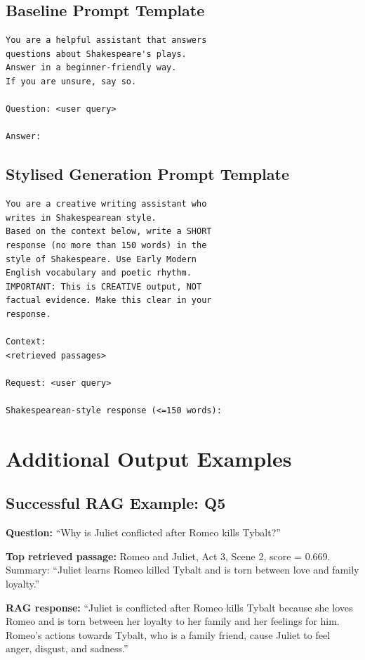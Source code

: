 \documentclass[10pt,conference]{IEEEtran}
\begin{document}
\subsection{Baseline Prompt Template}

\begin{lstlisting}[language={}]
You are a helpful assistant that answers
questions about Shakespeare's plays.
Answer in a beginner-friendly way.
If you are unsure, say so.

Question: <user query>

Answer:
\end{lstlisting}

\subsection{Stylised Generation Prompt Template}

\begin{lstlisting}[language={}]
You are a creative writing assistant who
writes in Shakespearean style.
Based on the context below, write a SHORT
response (no more than 150 words) in the
style of Shakespeare. Use Early Modern
English vocabulary and poetic rhythm.
IMPORTANT: This is CREATIVE output, NOT
factual evidence. Make this clear in your
response.

Context:
<retrieved passages>

Request: <user query>

Shakespearean-style response (<=150 words):
\end{lstlisting}

\section{Additional Output Examples}
\label{app:outputs}

\subsection{Successful RAG Example: Q5}

\textbf{Question:} ``Why is Juliet conflicted after Romeo kills Tybalt?''

\textbf{Top retrieved passage:} Romeo and Juliet, Act 3, Scene 2, score = 0.669. Summary: ``Juliet learns Romeo killed Tybalt and is torn between love and family loyalty.''

\textbf{RAG response:} ``Juliet is conflicted after Romeo kills Tybalt because she loves Romeo and is torn between her loyalty to her family and her feelings for him. Romeo's actions towards Tybalt, who is a family friend, cause Juliet to feel anger, disgust, and sadness.''
\end{document}

